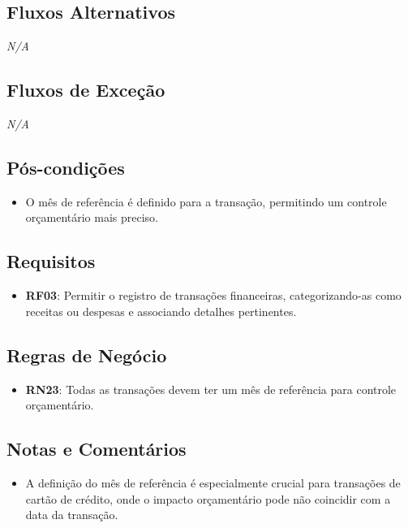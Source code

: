 \subsection*{Fluxos Alternativos}
\textit{N/A}

\subsection*{Fluxos de Exceção}
\textit{N/A}

\subsection*{Pós-condições}
\begin{addmargin}[1.5cm]{0cm}
	\begin{itemize}
		\item O mês de referência é definido para a transação, permitindo um controle orçamentário mais preciso.
	\end{itemize}
\end{addmargin}

\subsection*{Requisitos}
\begin{addmargin}[1.5cm]{0cm}
	\begin{itemize}
		\item \textbf{RF03}: Permitir o registro de transações financeiras, categorizando-as como receitas ou despesas e associando detalhes pertinentes.
	\end{itemize}
\end{addmargin}

\subsection*{Regras de Negócio}
\begin{addmargin}[1.5cm]{0cm}
	\begin{itemize}
		\item \textbf{RN23}: Todas as transações devem ter um mês de referência para controle orçamentário.
	\end{itemize}
\end{addmargin}

\subsection*{Notas e Comentários}
\begin{addmargin}[1.5cm]{0cm}
	\begin{itemize}
		\item A definição do mês de referência é especialmente crucial para transações de cartão de crédito, onde o impacto orçamentário pode não coincidir com a data da transação.
	\end{itemize}
\end{addmargin}
